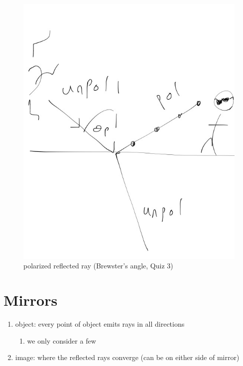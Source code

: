 \documentclass[twocolumn,11pt]{article}
\begin{document}
\begin{enumerate}
\begin{enumerate}
  						\begin{figure}
							\caption{polarized reflected ray (Brewster's angle, Quiz 3)}
							\begin{center}
  								\includegraphics[scale=0.4]{q3}
							\end{center}
  						\end{figure}
			  	\end{enumerate}
	\end{enumerate}
	
	\section*{Mirrors}
	\begin{enumerate}
		\item object: every point of object emits rays in all directions
			\begin{enumerate}
				\item we only consider a few
			\end{enumerate}
		\item image: where the reflected rays converge (can be on either side of mirror)
	\end{enumerate}
\end{document}
